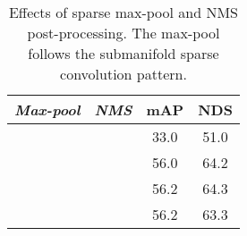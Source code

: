 \documentclass[10pt,twocolumn,letterpaper]{article}
\newcommand{\cmark}{\ding{51}}\newcommand{\xmark}{\ding{55}}\renewcommand{\thefootnote}{}
\begin{document}
\begin{table}[t]
\begin{center}
\caption{Comparison to the representative dense-head method Centerpoint~\cite{centerpoint}. ATE, ASE, AOE, AVE, and AAE denote the errors of location, size, orientation, velocity, and attribute.}
\label{tab:nuscenes-error-analysis}
\end{center}
\end{table}
\begin{table}[t]
\begin{center}
\caption{Efficiency statistics on sparse CNN backbone. The computations of Stage 5\&6 are limited by their small voxel numbers.}
\label{tab:nuscenes-efficiency-stages}
\end{center}
\end{table}
\begin{table}[t]
\begin{center}
\caption{Effects of sparse max-pool and NMS post-processing. The max-pool follows the submanifold sparse convolution pattern.}
\begin{tabular}{|c|c|cc|}
\hline
{\em Max-pool} &  {\em NMS}   &   mAP    & NDS  \\ \hline
 \xmark & \xmark & 33.0 & 51.0 \\
 \xmark & \cmark & 56.0 & 64.2 \\
\cmark & \xmark & 56.2 & 64.3 \\
\cmark & \cmark & 56.2 & 63.3 \\
\hline
\end{tabular}
\label{tab:nuscenes-maxpool-ablation}
\end{center}
\end{table}
\end{document}
